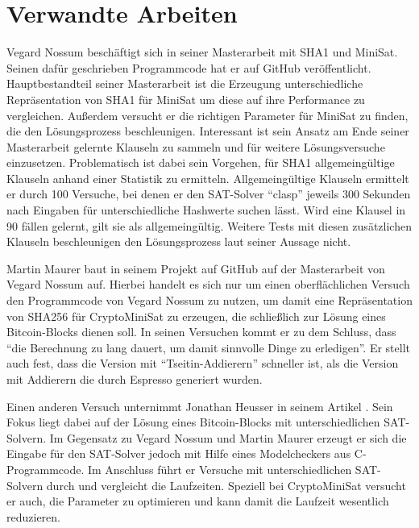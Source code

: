 \section{Verwandte Arbeiten}
\label{sec:otherwork}

Vegard Nossum beschäftigt sich in seiner Masterarbeit \cite{vegard:1} mit SHA1 und MiniSat.
Seinen dafür geschrieben Programmcode hat er auf GitHub \cite{vegard:2} veröffentlicht.
Hauptbestandteil seiner Masterarbeit ist die Erzeugung unterschiedliche Repräsentation von SHA1 für MiniSat
um diese auf ihre Performance zu vergleichen. Außerdem versucht er die richtigen Parameter für
MiniSat zu finden, die den Lösungsprozess beschleunigen. Interessant ist sein Ansatz am Ende seiner
Masterarbeit gelernte Klauseln zu sammeln und für weitere Lösungsversuche einzusetzen. Problematisch
ist dabei sein Vorgehen, für SHA1 allgemeingültige Klauseln anhand einer Statistik zu ermitteln.
Allgemeingültige Klauseln ermittelt er durch 100 Versuche, bei denen er den SAT-Solver "`clasp"'
jeweils 300 Sekunden nach Eingaben für unterschiedliche Hashwerte suchen lässt. Wird eine Klausel
in 90 fällen gelernt, gilt sie als allgemeingültig. Weitere Tests mit diesen zusätzlichen Klauseln
beschleunigen den Lösungsprozess laut seiner Aussage nicht.

Martin Maurer baut in seinem Projekt auf GitHub \cite{capiman} auf der Masterarbeit von Vegard Nossum auf.
Hierbei handelt es sich nur um einen oberflächlichen Versuch den Programmcode von Vegard Nossum zu nutzen,
um damit eine Repräsentation von SHA256 für CryptoMiniSat zu erzeugen, die schließlich zur Lösung eines
Bitcoin-Blocks dienen soll. In seinen Versuchen kommt er zu dem Schluss, dass "`die Berechnung zu lang dauert,
um damit sinnvolle Dinge zu erledigen"'. Er stellt auch fest, dass die Version mit "`Tseitin-Addierern"'
schneller ist, als die Version mit Addierern die durch Espresso generiert wurden.

Einen anderen Versuch unternimmt Jonathan Heusser in seinem Artikel \cite{jona:1}. Sein Fokus liegt dabei
auf der Lösung eines Bitcoin-Blocks mit unterschiedlichen SAT-Solvern. Im Gegensatz zu Vegard Nossum und
Martin Maurer erzeugt er sich die Eingabe für den SAT-Solver jedoch mit Hilfe eines Modelcheckers aus
C-Programmcode. Im Anschluss führt er Versuche mit unterschiedlichen SAT-Solvern durch und vergleicht die
Laufzeiten. Speziell bei CryptoMiniSat versucht er auch, die Parameter zu optimieren und kann damit die
Laufzeit wesentlich reduzieren.